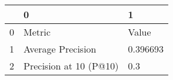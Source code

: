 \begin{tabular}{lll}
\toprule
{} &                       0 &         1 \\
\midrule
0 &                  Metric &     Value \\
1 &       Average Precision &  0.396693 \\
2 &  Precision at 10 (P@10) &       0.3 \\
\bottomrule
\end{tabular}
